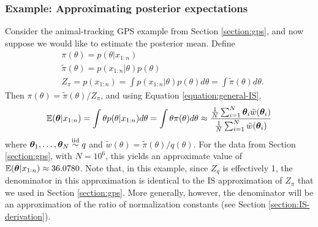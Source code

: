 \documentclass[12pt]{article}
\begin{document}
\subsubsection{Example: Approximating posterior expectations}
Consider the animal-tracking GPS example from Section \ref{section:gps}, and now suppose we would like to estimate the posterior mean. Define
\begin{align*}
    & \pi(\theta) = p(\theta|x_{1:n})\\
    & \tilde \pi(\theta) = p(x_{1:n}|\theta)p(\theta)\\
    & Z_\pi = p(x_{1:n}) = \int p(x_{1:n}|\theta)p(\theta)d\theta = \int \tilde\pi(\theta)d\theta.
\end{align*}
Then $\pi(\theta) = \tilde \pi(\theta) / Z_\pi$, and using Equation \ref{equation:general-IS},
\begin{align*}
    \mathbb{E}({\bm\theta}|x_{1:n}) = \int \theta p(\theta|x_{1:n})d\theta = \int \theta \pi(\theta)d\theta
    \approx \frac{\frac{1}{N}\sum_{i = 1}^N {\bm\theta}_i \tilde w({\bm\theta}_i)}{\frac{1}{N}\sum_{i = 1}^N \tilde w({\bm\theta}_i)}
\end{align*}
where ${\bm\theta}_1,\ldots,{\bm\theta}_N\stackrel{\mathrm{iid}}{\sim} q$ and $\tilde w(\theta) = \tilde \pi(\theta) / q(\theta)$.  For the data from Section \ref{section:gps}, with $N=10^6$, this yields an approximate value of $\mathbb{E}({\bm\theta}|x_{1:n}) \approx 36.0780$. Note that, in this example, since $Z_q$ is effectively 1, the denominator in this approximation is identical to the IS approximation of $Z_\pi$ that we used in Section \ref{section:gps}.  More generally, however, the denominator will be an approximation of the ratio of normalization constants (see Section \ref{section:IS-derivation}).
\end{document}
